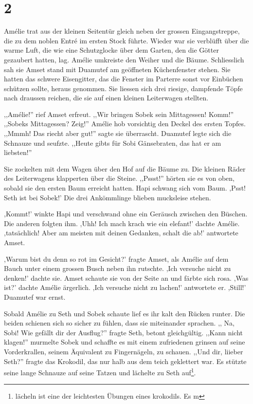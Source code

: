 \documentclass[11pt,titlepage,a5paper]{book}
\begin{document}
\section*{2}

Amélie trat aus der kleinen Seitentür gleich neben der grossen Eingangstreppe, die zu dem noblen Entré im ersten Stock führte. Wieder war sie verblüfft über die warme Luft, die wie eine Schutzglocke über dem Garten, den die Götter gezaubert hatten, lag. Amélie umkreiste den Weiher und die Bäume. Schliesslich sah sie Amset stand mit Duamutef am geöffneten Küchenfenster stehen. Sie hatten das schwere Eisengitter, das die Fenster im Parterre sonst vor Einbüchen schützen sollte, heraus genommen. Sie liessen sich drei riesige, dampfende Töpfe nach draussen reichen, die sie auf einen kleinen Leiterwagen stellten.

,,Amélie!'' rief Amset erfreut. ,,Wir bringen Sobek sein Mittagessen! Komm!'' ,,Sobeks Mittagessen? Zeig!'' Amélie hob vorsichtig den Deckel des ersten Topfes. ,,Mmmh! Das riecht aber gut!'' sagte sie überrascht. Duamutef legte sich die Schnauze und seufzte. ,,Heute gibts für Sobi Gänsebraten, das hat er am liebsten!''

Sie zockelten mit dem Wagen über den Hof auf die Bäume zu. Die kleinen Räder des Leiterwagens klapperten über die Steine. ,,Pssst!'' hörten sie es von oben, sobald sie den ersten Baum erreicht hatten. Hapi schwang sich vom Baum. ,Psst! Seth ist bei Sobek!' Die drei Ankömmlinge blieben mucksleise stehen. 

,Kommt!' winkte Hapi und verschwand ohne ein Geräusch zwischen den Büschen. Die anderen folgten ihm. ,Uhh! Ich mach krach wie ein elefant!' dachte Amélie. ,tatsächlich! Aber am meisten mit deinen Gedanken, schalt die ab!' antwortete Amset.

,Warum bist du denn so rot im Gesicht?' fragte Amset, als Amélie  auf dem Bauch unter einem grossen Busch neben ihn rutschte. ,Ich versuche nicht zu denken!' dachte sie. Amset schaute sie von der Seite an und färbte sich rosa. ,Was ist?' dachte Amélie ärgerlich. ,Ich versuche nicht zu lachen!' antwortete er. ,Still!' Duamutef war ernst.

Sobald Amélie zu Seth und Sobek schaute lief es ihr kalt den Rücken runter. Die beiden schienen sich so sicher zu fühlen, dass sie miteinander sprachen. ,, Na, Sobi! Wie gefällt dir der Ausflug?'' fragte Seth, betont gleichgültig. ,,Kann nicht klagen!'' murmelte Sobek und schaffte es mit einem zufriedenen grinsen auf seine Vorderkrallen, seinem Äquivalent zu Fingernägeln, zu schauen. ,,Und dir, liieber Seth?'' fragte das Krokodil, das nur halb aus dem teich geklettert war. Es stützte seine lange Schnauze auf seine Tatzen und lächelte zu Seth auf\footnote{lächeln ist eine der leichtesten Übungen eines krokodils. Es m}.
\end{document}

